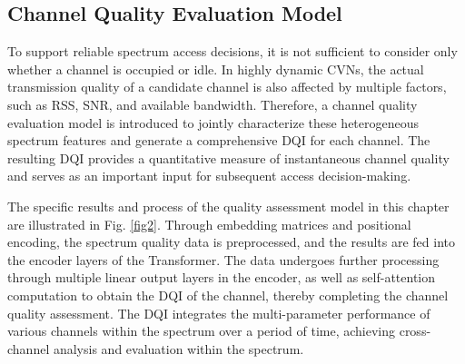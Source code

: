 \documentclass[journal]{IEEEtran}
\begin{document}
\subsection{Channel Quality Evaluation Model}
To support reliable spectrum access decisions, it is not sufficient to consider only whether a channel is occupied or idle. In highly dynamic CVNs, the actual transmission quality of a candidate channel is also affected by multiple factors, such as RSS, SNR, and available bandwidth. Therefore, a channel quality evaluation model is introduced to jointly characterize these heterogeneous spectrum features and generate a comprehensive DQI for each channel. The resulting DQI provides a quantitative measure of instantaneous channel quality and serves as an important input for subsequent access decision-making.\par
The specific results and process of the quality assessment model in this chapter are illustrated in Fig. \ref{fig2}. Through embedding matrices and positional encoding, the spectrum quality data is preprocessed, and the results are fed into the encoder layers of the Transformer. The data undergoes further processing through multiple linear output layers in the encoder, as well as self-attention computation to obtain the DQI of the channel, thereby completing the channel quality assessment. The DQI integrates the multi-parameter performance of various channels within the spectrum over a period of time, achieving cross-channel analysis and evaluation within the spectrum.
\end{document}
